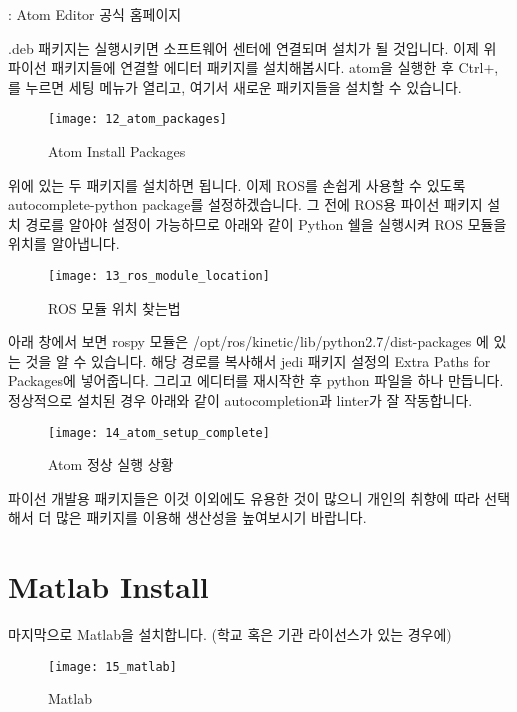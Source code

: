 \documentclass[11pt,fleqn]{book} %
\begin{document}
\begin{link}
  : Atom Editor 공식 홈페이지
\end{link}

.deb 패키지는 실행시키면 소프트웨어 센터에 연결되며 설치가 될 것입니다. 이제 위 파이선 패키지들에 연결할 에디터 패키지를 설치해봅시다.
atom을 실행한 후 Ctrl+, 를 누르면 세팅 메뉴가 열리고, 여기서 새로운 패키지들을 설치할 수 있습니다.

\begin{figure}[h]
\centering\texttt{[image: 12\_atom\_packages]}
\caption{Atom Install Packages}
\end{figure}

위에 있는 두 패키지를 설치하면 됩니다. 이제 ROS를 손쉽게 사용할 수 있도록 autocomplete-python package를 설정하겠습니다.
그 전에 ROS용 파이선 패키지 설치 경로를 알아야 설정이 가능하므로 아래와 같이 Python 쉘을 실행시켜 ROS 모듈을 위치를 알아냅니다.

\begin{figure}[h]
\centering\texttt{[image: 13\_ros\_module\_location]}
\caption{ROS 모듈 위치 찾는법}
\end{figure}

아래 창에서 보면 rospy 모듈은 /opt/ros/kinetic/lib/python2.7/dist-packages 에 있는 것을 알 수 있습니다.
해당 경로를 복사해서 jedi 패키지 설정의 Extra Paths for Packages에 넣어줍니다. 그리고 에디터를 재시작한 후 python 파일을 하나 만듭니다.
정상적으로 설치된 경우 아래와 같이 autocompletion과 linter가 잘 작동합니다.

\begin{figure}[h]
\centering\texttt{[image: 14\_atom\_setup\_complete]}
\caption{Atom 정상 실행 상황}
\end{figure}

파이선 개발용 패키지들은 이것 이외에도 유용한 것이 많으니 개인의 취향에 따라 선택해서 더 많은 패키지를 이용해 생산성을 높여보시기 바랍니다.


\section{Matlab Install}

마지막으로 Matlab을 설치합니다. (학교 혹은 기관 라이선스가 있는 경우에)

\begin{figure}[h]
\centering\texttt{[image: 15\_matlab]}
\caption{Matlab}
\end{figure}
\end{document}
